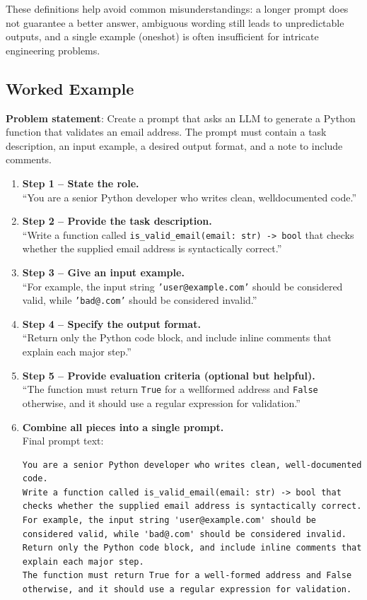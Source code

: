 \documentclass[12pt, a4paper]{article}
\begin{document}
These definitions help avoid common misunderstandings: a longer prompt does not guarantee a better answer, ambiguous wording still leads to unpredictable outputs, and a single example (oneshot) is often insufficient for intricate engineering problems.

\subsection{Worked Example}
\textbf{Problem statement}: Create a prompt that asks an LLM to generate a Python function that validates an email address.  The prompt must contain a task description, an input example, a desired output format, and a note to include comments.

\begin{enumerate}
    \item \textbf{Step 1 -- State the role.}\\
    ``You are a senior Python developer who writes clean, welldocumented code.''

    \item \textbf{Step 2 -- Provide the task description.}\\
    ``Write a function called \texttt{is_valid_email(email: str) -> bool} that checks whether the supplied email address is syntactically correct.''

    \item \textbf{Step 3 -- Give an input example.}\\
    ``For example, the input string \texttt{'user@example.com'} should be considered valid, while \texttt{'bad@.com'} should be considered invalid.''

    \item \textbf{Step 4 -- Specify the output format.}\\
    ``Return only the Python code block, and include inline comments that explain each major step.''

    \item \textbf{Step 5 -- Provide evaluation criteria (optional but helpful).}\\
    ``The function must return \texttt{True} for a wellformed address and \texttt{False} otherwise, and it should use a regular expression for validation.''

    \item \textbf{Combine all pieces into a single prompt.}\\
    Final prompt text:
    
    \begin{verbatim}
You are a senior Python developer who writes clean, well-documented code.
Write a function called is_valid_email(email: str) -> bool that checks whether the supplied email address is syntactically correct.
For example, the input string 'user@example.com' should be considered valid, while 'bad@.com' should be considered invalid.
Return only the Python code block, and include inline comments that explain each major step.
The function must return True for a well-formed address and False otherwise, and it should use a regular expression for validation.
    \end{verbatim}
\end{enumerate}
\end{document}
